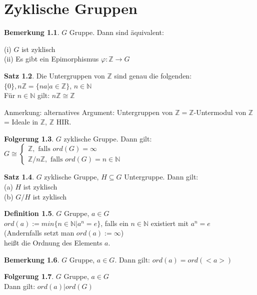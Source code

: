 \documentclass[10pt,a4paper,numbers=endperiod]{scrreprt}
\theoremstyle{definition}
\newtheorem{satz}{Satz}[section]
\newtheorem{defi}[satz]{Definition}
\newtheorem{bem}[satz]{Bemerkung}
\newtheorem{folg}[satz]{Folgerung}
\def\NN{{\mathbb N}}
\def\ZZ{{\mathbb Z}}
\begin{document}
\chapter{Zyklische Gruppen}

\begin{bem}
	$G$ Gruppe. Dann sind äquivalent:
	
	(i) $G$ ist zyklisch\\
	(ii) Es gibt ein Epimorphismus $\varphi: \ZZ \rightarrow G$
\end{bem}

\begin{satz}
	Die Untergruppen von $\ZZ$ sind genau die folgenden:\\
	$\{0\}, n \ZZ = \{na| a \in \ZZ\}$, $n \in \NN$\\
	Für $n \in \NN$ gilt: $n \ZZ \cong \ZZ$
\end{satz}

Anmerkung: alternatives Argument: Untergruppen von $\ZZ = \ZZ$-Untermodul von $\ZZ$ = Ideale in $\ZZ$, $\ZZ$ HIR.

\begin{folg}
	$G$ zyklische Gruppe. Dann gilt:\\
	$G \cong \begin{cases}
	\ZZ, \text{ falls } ord(G) = \infty\\
	\ZZ/n\ZZ, \text{ falls } ord(G) = n \in \NN
	\end{cases}$
\end{folg}

\begin{satz}
	$G$ zyklische Gruppe, $H \subseteq G$ Untergruppe. Dann gilt:\\
	(a) $H$ ist zyklisch\\
	(b) $G/H$ ist zyklisch
\end{satz}

\begin{defi}
	$G$ Gruppe, $a \in G$\\
	$ord(a) := min\{n \in \NN| a^n = e\}$, falls ein $n \in \NN$ existiert mit $a^n = e$\\
	(Andernfalls setzt man $ord(a) := \infty$)\\
	heißt die Ordnung des Elements $a$.
\end{defi}

\begin{bem}
	$G$ Gruppe, $a \in G$. Dann gilt: $ord(a) = ord(<a>)$
\end{bem}

\begin{folg}
	$G$ Gruppe, $a \in G$\\
	Dann gilt: $ord(a)|ord(G)$
\end{folg}
\end{document}
